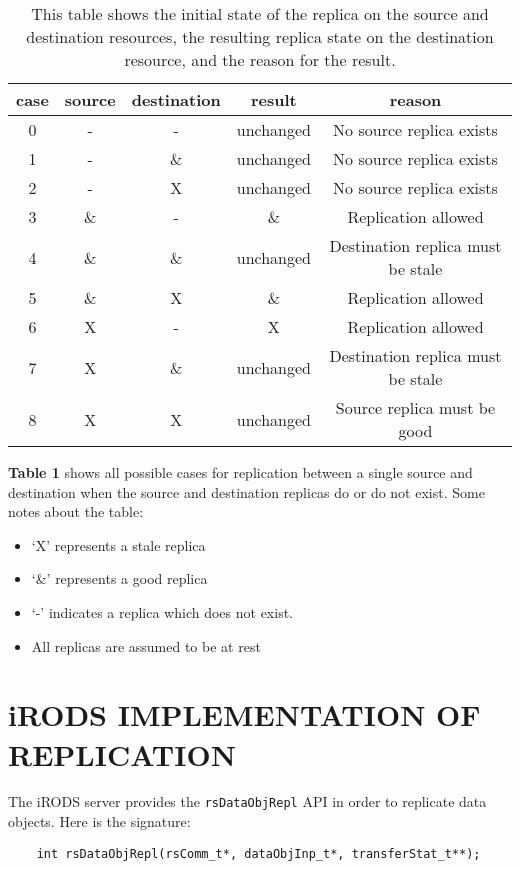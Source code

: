 \documentclass{irodsugm}
\begin{document}
\begin{table}[]
    \centering
    \begin{tabular}{c | c | c | c | c}
        case & source & destination & result & reason \\
        \hline
        0 & - & - & unchanged & No source replica exists \\
        1 & - & \& & unchanged & No source replica exists \\
        2 & - & X & unchanged & No source replica exists \\
        3 & \& & - & \& & Replication allowed \\
        4 & \& & \& & unchanged & Destination replica must be stale \\
        5 & \& & X & \& & Replication allowed \\
        6 & X & - & X & Replication allowed \\
        7 & X & \& & unchanged & Destination replica must be stale \\
        8 & X & X & unchanged & Source replica must be good
    \end{tabular}
    \caption{This table shows the initial state of the replica on the source and destination resources, the resulting replica state on the destination resource, and the reason for the result.}
    \label{tab:replication_behavior_table}
\end{table}

\textbf{Table 1} shows all possible cases for replication between a single source and destination when the source and destination replicas do or do not exist. Some notes about the table:
\begin{itemize}
    \item ‘X’ represents a stale replica
    \item ‘\&’ represents a good replica
    \item ‘-’ indicates a replica which does not exist.
    \item All replicas are assumed to be at rest
\end{itemize}

\section*{iRODS IMPLEMENTATION OF REPLICATION}

The iRODS server provides the \texttt{rsDataObjRepl} API in order to replicate data objects. Here is the signature:

\begin{samepage}
\begin{verbatim}
    int rsDataObjRepl(rsComm_t*, dataObjInp_t*, transferStat_t**);
\end{verbatim}
\end{samepage}
\end{document}
